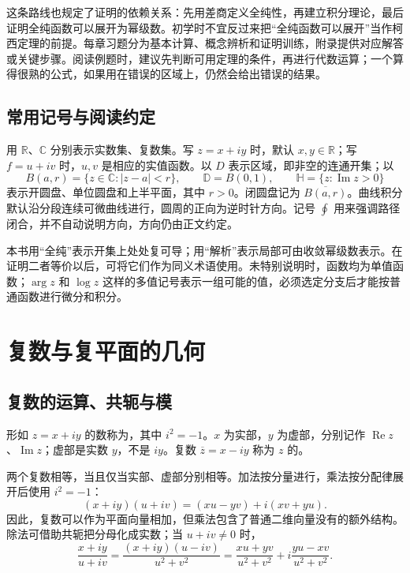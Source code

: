 \documentclass[UTF8,12pt,a4paper,fontset=fandol]{ctexbook}
\begin{document}
这条路线也规定了证明的依赖关系：先用差商定义全纯性，再建立积分理论，最后证明全纯函数可以展开为幂级数。初学时不宜反过来把“全纯函数可以展开”当作柯西定理的前提。每章习题分为基本计算、概念辨析和证明训练，附录提供对应解答或关键步骤。阅读例题时，建议先判断可用定理的条件，再进行代数运算；一个算得很熟的公式，如果用在错误的区域上，仍然会给出错误的结果。

\section{常用记号与阅读约定}

用 $\mathbb R$、$\mathbb C$ 分别表示实数集、复数集。写 $z=x+iy$ 时，默认 $x,y\in\mathbb R$；写 $f=u+iv$ 时，$u,v$ 是相应的实值函数。以 $D$ 表示区域，即非空的连通开集；以
\[
 B(a,r)=\{z\in\mathbb C:|z-a|<r\},\qquad
 \mathbb D=B(0,1),\qquad \mathbb H=\{z:\operatorname{Im}z>0\}
\]
表示开圆盘、单位圆盘和上半平面，其中 $r>0$。闭圆盘记为 $\overline{B(a,r)}$。曲线积分默认沿分段连续可微曲线进行，圆周的正向为逆时针方向。记号 $\oint$ 用来强调路径闭合，并不自动说明方向，方向仍由正文约定。

本书用“全纯”表示开集上处处复可导；用“解析”表示局部可由收敛幂级数表示。在证明二者等价以后，可将它们作为同义术语使用。未特别说明时，函数均为单值函数；$\arg z$ 和 $\log z$ 这样的多值记号表示一组可能的值，必须选定分支后才能按普通函数进行微分和积分。

\chapter{复数与复平面的几何}
\label{chap:cv-plane}

\section{复数的运算、共轭与模}

\begin{definition}[复数与共轭]
形如 $z=x+iy$ 的数称为，其中 $i^2=-1$。$x$ 为实部，$y$ 为虚部，分别记作 $\operatorname{Re}z$、$\operatorname{Im}z$；虚部是实数 $y$，不是 $iy$。复数 $\overline z=x-iy$ 称为 $z$ 的。
\end{definition}

两个复数相等，当且仅当实部、虚部分别相等。加法按分量进行，乘法按分配律展开后使用 $i^2=-1$：
\[
 (x+iy)(u+iv)=(xu-yv)+i(xv+yu).
\]
因此，复数可以作为平面向量相加，但乘法包含了普通二维向量没有的额外结构。除法可借助共轭把分母化成实数；当 $u+iv\ne0$ 时，
\[
 \frac{x+iy}{u+iv}
 =\frac{(x+iy)(u-iv)}{u^2+v^2}
 =\frac{xu+yv}{u^2+v^2}+i\frac{yu-xv}{u^2+v^2}.
\]
\end{document}

